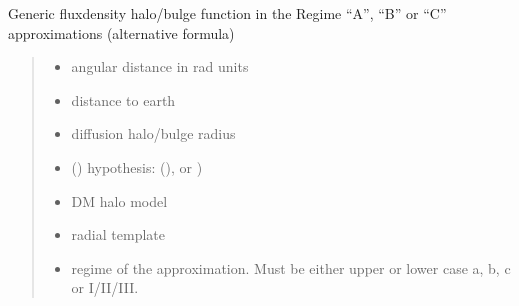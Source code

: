\documentclass[letterpaper,10pt,english]{sphinxmanual}
\begin{document}
\begin{fulllineitems}
\label{\detokenize{diffsph.profiles:diffsph.profiles.hfactors.H_fluxdens_approx}}
\pysigstartsignatures
{}
\pysigstopsignatures
\sphinxAtStartPar
Generic flux\sphinxhyphen{}density halo/bulge function in the Regime “A”, “B” or “C” approximations (alternative formula)
\begin{quote}\begin{description}
\begin{itemize}
\item {} 
\sphinxAtStartPar
{} \textendash{} angular distance in rad units

\item {} 
\sphinxAtStartPar
{} \textendash{} distance to earth

\item {} 
\sphinxAtStartPar
{} \textendash{} diffusion halo/bulge radius

\item {} 
\sphinxAtStartPar
{} () \textendash{} hypothesis:  (),  or )

\item {} 
\sphinxAtStartPar
{} \textendash{} DM halo model

\item {} 
\sphinxAtStartPar
{} \textendash{} radial template

\item {} 
\sphinxAtStartPar
{} \textendash{} regime of the approximation. Must be either upper or lower case a, b, c or I/II/III.


\end{itemize}
\end{description}
\end{quote}
\end{fulllineitems}
\end{document}
